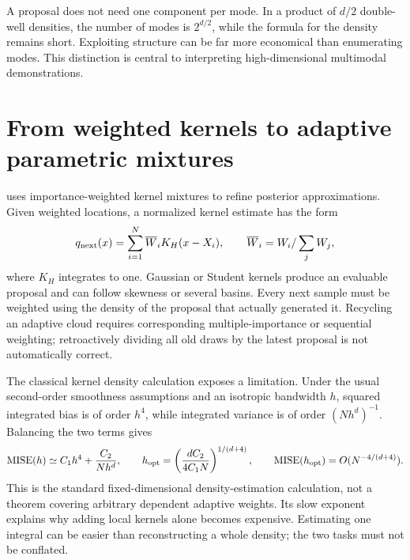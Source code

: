 A proposal does not need one component per mode. In a product of $d/2$
double-well densities, the number of modes is $2^{d/2}$, while the formula for
the density remains short. Exploiting structure can be far more economical than
enumerating modes. This distinction is central to interpreting high-dimensional
multimodal demonstrations.

\section[Weighted kernels and adaptive mixtures]{From weighted kernels to adaptive parametric mixtures}

\citet[Sections 2.1--2.2]{west1993mixtures} uses importance-weighted kernel
mixtures to refine posterior approximations. Given weighted locations, a
normalized kernel estimate has the form
\begin{equation}
 q_{\rm next}(x)=\sum_{i=1}^N\overline W_i K_H(x-X_i),\qquad
 \overline W_i=W_i/\sum_jW_j,
 \label{eq:bf-is-kernel-mixture}
\end{equation}
where $K_H$ integrates to one. Gaussian or Student kernels produce an evaluable
proposal and can follow skewness or several basins. Every next sample must be
weighted using the density of the proposal that actually generated it.
Recycling an adaptive cloud requires corresponding multiple-importance or
sequential weighting; retroactively dividing all old draws by the latest
proposal is not automatically correct.

The classical kernel density calculation exposes a limitation. Under the
usual second-order smoothness assumptions and an isotropic bandwidth $h$,
squared integrated bias is of order $h^4$, while integrated variance is of
order $(Nh^d)^{-1}$. Balancing the two terms gives
\begin{equation}
 \mathrm{MISE}(h)\simeq C_1h^4+\frac{C_2}{Nh^d},\qquad
 h_{\rm opt}=\left(\frac{dC_2}{4C_1N}\right)^{1/(d+4)},\qquad
 \mathrm{MISE}(h_{\rm opt})=O(N^{-4/(d+4)}).
 \label{eq:bf-is-kde-rate}
\end{equation}
This is the standard fixed-dimensional density-estimation calculation, not a
theorem covering arbitrary dependent adaptive weights. Its slow exponent
explains why adding local kernels alone becomes expensive. Estimating one
integral can be easier than reconstructing a whole density; the two tasks
must not be conflated.

